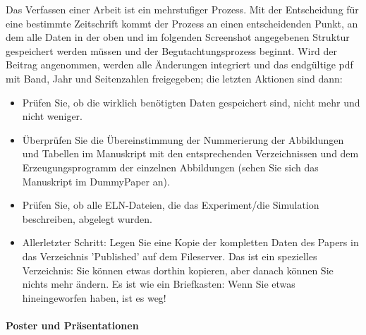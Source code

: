 Das Verfassen einer Arbeit ist ein mehrstufiger Prozess. Mit der Entscheidung
für eine bestimmte Zeitschrift kommt der Prozess an einen entscheidenden Punkt,
an dem alle Daten in der oben und im folgenden Screenshot angegebenen Struktur
gespeichert werden müssen und der Begutachtungsprozess beginnt. Wird der Beitrag
angenommen, werden alle Änderungen integriert und das endgültige pdf mit Band,
Jahr und Seitenzahlen freigegeben; die letzten Aktionen sind dann:
\begin{itemize}
  \item Prüfen Sie, ob die wirklich benötigten Daten gespeichert sind, nicht
        mehr und nicht weniger.
  \item Überprüfen Sie die Übereinstimmung der Nummerierung der Abbildungen und
        Tabellen im Manuskript mit den entsprechenden Verzeichnissen und dem
        Erzeugungsprogramm der einzelnen Abbildungen (sehen Sie sich das
        Manuskript im DummyPaper an).
  \item Prüfen Sie, ob alle ELN-Dateien, die das Experiment/die Simulation
        beschreiben, abgelegt wurden.
  \item Allerletzter Schritt: Legen Sie eine Kopie der kompletten Daten des
        Papers in das Verzeichnis 'Published' auf dem Fileserver. Das ist ein
        spezielles Verzeichnis: Sie können etwas dorthin kopieren, aber danach
        können Sie nichts mehr ändern. Es ist wie ein Briefkasten: Wenn Sie
        etwas hineingeworfen haben, ist es weg!
\end{itemize}

\paragraph{Poster und Präsentationen}

